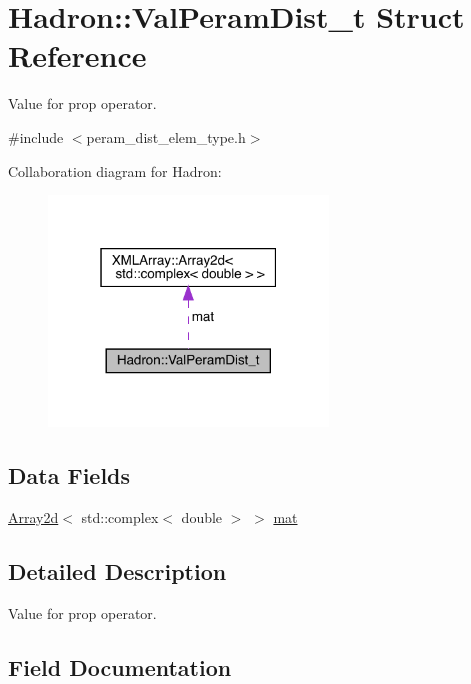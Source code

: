 \hypertarget{structHadron_1_1ValPeramDist__t}{}\section{Hadron\+:\+:Val\+Peram\+Dist\+\_\+t Struct Reference}
\label{structHadron_1_1ValPeramDist__t}


Value for prop operator.  




{\ttfamily \#include $<$peram\+\_\+dist\+\_\+elem\+\_\+type.\+h$>$}



Collaboration diagram for Hadron\+:\nopagebreak
\begin{figure}[H]
\begin{center}
\leavevmode
\includegraphics[width=211pt]{df/d76/structHadron_1_1ValPeramDist__t__coll__graph}
\end{center}
\end{figure}
\subsection*{Data Fields}
\begin{DoxyCompactItemize}
\item 
\mbox{\hyperlink{classXMLArray_1_1Array2d}{Array2d}}$<$ std\+::complex$<$ double $>$ $>$ \mbox{\hyperlink{structHadron_1_1ValPeramDist__t_aa46b68ae41c389d0f43698862be9fb05}{mat}}
\end{DoxyCompactItemize}


\subsection{Detailed Description}
Value for prop operator. 

\subsection{Field Documentation}
\mbox{\label{structHadron_1_1ValPeramDist__t_aa46b68ae41c389d0f43698862be9fb05}} 

